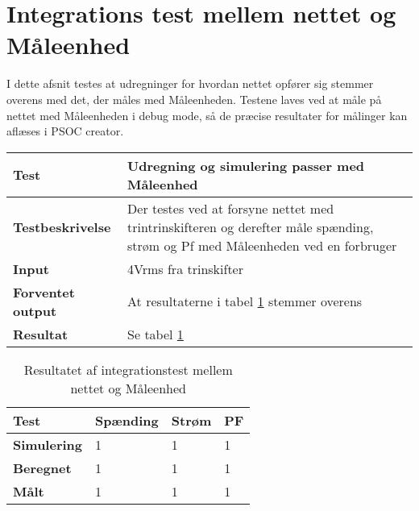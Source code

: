 
\section{Integrations test mellem nettet og Måleenhed}
I dette afsnit testes at udregninger for hvordan nettet opfører sig stemmer overens med det, der måles med Måleenheden.
Testene laves ved at måle på nettet med Måleenheden i debug mode, så de præcise resultater for målinger kan aflæses i PSOC creator.



\begin{center}
	\begin{tabular}{ | m{} | m{}|} 
		\hline
		\textbf{Test}					&Udregning og simulering passer med Måleenhed \\ \hline
		\textbf{Testbeskrivelse}		&Der testes ved at forsyne nettet med trintrinskifteren og derefter måle spænding, strøm og Pf med Måleenheden ved en forbruger \\ \hline
		\textbf{Input}					&4Vrms fra trinskifter \\ \hline
		\textbf{Forventet output}		&At resultaterne i tabel \ref{tab:intTest2} stemmer overens \\ \hline
		\textbf{Resultat}				&Se tabel \ref{tab:intTest2} \\ \hline
	\end{tabular}
\end{center}


\begin{table}[H]
	\begin{tabular}{ | m{} | m{} | m{} | m{}|}  
		\hline
		\textbf{Test}			& \textbf{Spænding} & \textbf{Strøm}  	& \textbf{PF}			\\ \hline
		\textbf{Simulering}		&1					&1				  	&1 					\\ \hline
		\textbf{Beregnet}		&1 					&1					&1					\\ \hline
		\textbf{Målt}			&1 					&1					&1					\\ \hline
	\end{tabular}
	\caption{Resultatet af integrationstest mellem nettet og Måleenhed}
	\label{tab:intTest2}
\end{table}
